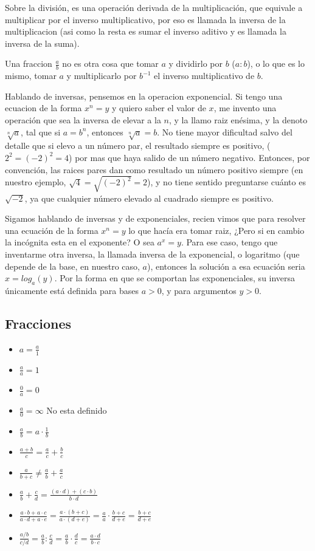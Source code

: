 \documentclass[%
 aip,
 jmp,%
 amsmath,amssymb,
 reprint,%
]{revtex4-1}
\begin{document}
Sobre la división, es una operación derivada de la multiplicación, que equivale a multiplicar por el inverso multiplicativo, por eso es llamada la inversa de la multiplicacion (asi como la resta es sumar el inverso aditivo y es llamada la inversa de la suma).

Una fraccion $\frac{a}{b}$ no es otra cosa que tomar $a$ y dividirlo por $b$ ($a:b$), o lo que es lo mismo, tomar $a$ y multiplicarlo por $b^{-1}$ el inverso multiplicativo de $b$.

Hablando de inversas, pensemos en la operacion exponencial. Si tengo una ecuacion de la forma $x^n=y$ y quiero saber el valor de $x$, me invento una operación que sea la inversa de elevar a la $n$, y la llamo raiz enésima, y la denoto $\sqrt[n]{a}$, tal que si $a=b^n$, entonces $\sqrt[n]{a}=b$. No tiene mayor dificultad salvo del detalle que si elevo a un número par, el resultado siempre es positivo, ($2^2=(-2)^2=4$) por mas que haya salido de un número negativo. Entonces, por convención, las raices pares dan como resultado un número positivo siempre (en nuestro ejemplo, $\sqrt{4}=\sqrt{(-2)^2}=2$), y no tiene sentido preguntarse cuánto es $\sqrt{-2}$, ya que cualquier número elevado al cuadrado siempre es positivo.

Sigamos hablando de inversas y de exponenciales, recien vimos que para resolver una ecuación de la forma $x^n=y$ lo que hacía era tomar raiz, ¿Pero si en cambio la incógnita esta en el exponente? O sea $a^x=y$. Para ese caso, tengo que inventarme otra inversa, la llamada inversa de la exponencial, o logaritmo (que depende de la base, en nuestro caso, $a$), entonces la solución a esa ecuación seria $x=log_a(y)$. Por la forma en que se comportan las exponenciales, su inversa únicamente está definida para bases $a>0$, y para argumentos $y>0$.

\subsection{Fracciones}

\begin{itemize}
\item $a=\frac{a}{1}$
\item $\frac{a}{a}=1$
\item $\frac{0}{a}=0$
\item $\frac{a}{0}=\infty$ No esta definido
\item $\frac{a}{b}=a \cdot \frac{1}{b}$
\item $\frac{a + b}{c} = \frac{a}{c} + \frac{b}{c}$
\item $\frac{a}{b + c} \neq \frac{a}{b} + \frac{a}{c}$
\item $\frac{a}{b}+\frac{c}{d}=\frac{(a \cdot d) + (c \cdot b)}{b \cdot d}$
\item $\frac{a \cdot b + a \cdot c}{a \cdot d + a \cdot e} = \frac{a \cdot (b + c)}{a \cdot (d +e)} = \frac{a}{a} \cdot \frac{b +c}{d + e} = \frac{b + c}{d + e}$
\item $\frac{a/b}{c/d}=\frac{a}{b}:\frac{c}{d}=\frac{a}{b} \cdot \frac{d}{c} = \frac{a \cdot d}{b \cdot c}$
\end{itemize}
\end{document}
